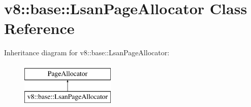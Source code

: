 \hypertarget{classv8_1_1base_1_1LsanPageAllocator}{}\section{v8\+:\+:base\+:\+:Lsan\+Page\+Allocator Class Reference}
\label{classv8_1_1base_1_1LsanPageAllocator}
Inheritance diagram for v8\+:\+:base\+:\+:Lsan\+Page\+Allocator\+:\begin{figure}[H]
\begin{center}
\leavevmode
\includegraphics[height=2.000000cm]{classv8_1_1base_1_1LsanPageAllocator}
\end{center}
\end{figure}
